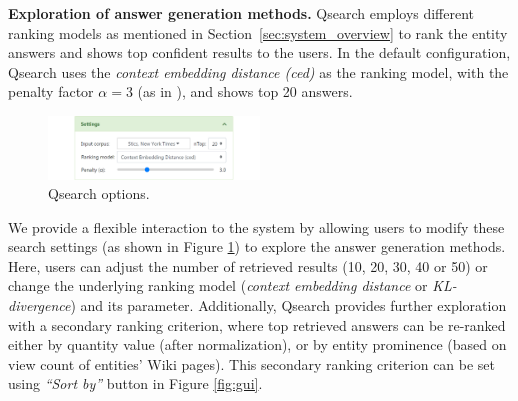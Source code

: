 \noindent \textbf{Exploration of answer generation methods.} Qsearch employs different ranking models as mentioned in Section~\ref{sec:system_overview} to rank the entity answers and shows top confident results to the users. 
In the default configuration, Qsearch uses the \textit{context embedding distance (ced)} as the ranking model, with the penalty factor $\alpha = 3$ (as in \cite{HoISWC2019}), and shows top 20 answers. 
\begin{figure}[t]
\centering
\includegraphics[width=0.5\textwidth]{figures/new/settings.png}
\caption{Qsearch options.}
\label{fig:settings}
\vspace{-1em}
\end{figure}
We provide a flexible interaction to the system by allowing users to modify these search settings (as shown in Figure \ref{fig:settings}) to explore the answer generation methods. 
Here, users can adjust the number of retrieved results (10, 20, 30, 40 or 50) or change the underlying ranking model (\textit{context embedding distance} or \textit{KL-divergence}) and its parameter. Additionally, Qsearch provides further exploration with a secondary ranking criterion, where top retrieved answers can be re-ranked either by quantity value (after normalization), or by entity prominence (based on view count of entities' Wiki pages).
This secondary ranking criterion can be set using \textit{``Sort by''} button in Figure \ref{fig:gui}.





